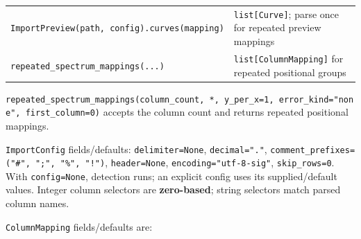 \documentclass[
  10pt,
  a4paper,
  oneside]{scrreprt}
\begin{document}
\begin{longtable}[]{@{}ll@{}}
\begin{minipage}[t]{0.47\columnwidth}\raggedright
\texttt{ImportPreview(path,\ config).curves(mapping)}\strut
\end{minipage} & \begin{minipage}[t]{0.47\columnwidth}\raggedright
\texttt{list{[}Curve{]}}; parse once for repeated preview mappings\strut
\end{minipage}\tabularnewline
\begin{minipage}[t]{0.47\columnwidth}\raggedright
\texttt{repeated\_spectrum\_mappings(...)}\strut
\end{minipage} & \begin{minipage}[t]{0.47\columnwidth}\raggedright
\texttt{list{[}ColumnMapping{]}} for repeated positional groups\strut
\end{minipage}\tabularnewline
\bottomrule
\end{longtable}

\texttt{repeated\_spectrum\_mappings(column\_count,\ *,\ y\_per\_x=1,\ error\_kind="none",\ first\_column=0)}
accepts the column count and returns repeated positional mappings.

\texttt{ImportConfig} fields/defaults: \texttt{delimiter=None},
\texttt{decimal="."},
\texttt{comment\_prefixes=("\#",\ ";",\ "\%",\ "!")},
\texttt{header=None}, \texttt{encoding="utf-8-sig"},
\texttt{skip\_rows=0}. With \texttt{config=None}, detection runs; an
explicit config uses its supplied/default values. Integer column
selectors are \textbf{zero-based}; string selectors match parsed column
names.

\texttt{ColumnMapping} fields/defaults are:
\end{document}
